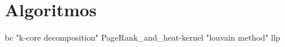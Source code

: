 \chapter{Algoritmos}

{bc}
{"k-core decomposition"}
{PageRank_and_heat-kernel}
{"louvain method"}
{llp}
